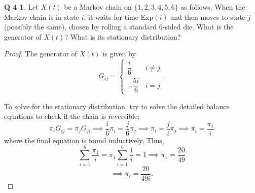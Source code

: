 \documentclass[12pt]{article}
\theoremstyle{definition}
\newtheorem*{prob4}{Q 4}
\begin{document}
\begin{prob4}
Let $X(t)$ be a Markov chain on $\{1,2,3,4,5,6\}$ as follows.  When the Markov chain is in state $i$, it waits for time Exp$(i)$ and then moves to state $j$ (possibly the same), chosen by rolling a standard 6-sided die.  What is the generator of $X(t)$?  What is its stationary distribution?
\end{prob4}

\begin{proof}
The generator of $X(t)$ is given by
$$
G_{ij} =
\begin{cases}
\dfrac{i}{6} & i \neq j \\
-\dfrac{5i}{6} & i = j
\end{cases}.
$$

To solve for the stationary distribution, try to solve the detailed balance equations to check if the chain is reversible:
$$
\pi_i G_{ij} = \pi_j G_{ji} \implies
\frac{i}{6} \pi_i = \frac{j}{6}\pi_j \implies
\pi_i = \frac{j}{i} \pi_j \implies
\pi_i = \frac{\pi_1}{i}
$$
where the final equation is found inductively.  Thus,
$$
\sum\limits_{i=1}^6 \frac{\pi_1}{i} = \pi_1 \sum\limits_{i=1}^6 \frac1i = 1 \implies
\pi_1 = \frac{20}{49}
$$
$$
\implies \pi_i = \frac{20}{49i}.
$$

\end{proof}
\end{document}
